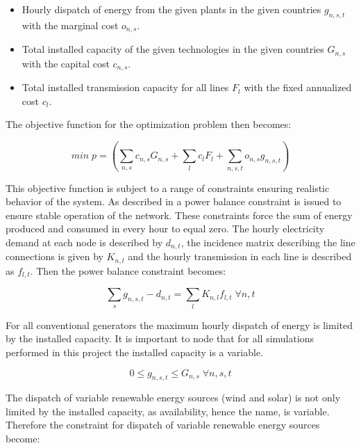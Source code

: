 \begin{itemize}
	\item Hourly dispatch of energy from the given plants in the given countries $g_{n,s,t}$ with the marginal cost $o_{n,s}$.
	\item Total installed capacity of the given technologies in the given countries $G_{n,s}$ with the capital cost $c_{n,s}$.
	\item Total installed transmission capacity for all lines $F_{l}$ with the fixed annualized cost $c_{l}$.
	
\end{itemize}

The objective function for the optimization problem then becomes: 

\begin{equation}
min \; p = \left( \sum_{n,s} c_{n,s} G_{n,s} + \sum_l c_l F_l + \sum_{n,s,t} o_{n,s} g_{n,s,t} \right)
\end{equation}{}

This objective function is subject to a range of constraints ensuring realistic behavior of the system. As described in \cite{PyPSA_euro_30_model} a power balance constraint is issued to ensure stable operation of the network. These constraints force the sum of energy produced and consumed in every hour to equal zero. The hourly electricity demand at each node is described by $d_{n,t}$, the incidence matrix describing the line connections is given by $K_{n,l}$ and the hourly transmission in each line is described as $f_{l,t}$. Then the power balance constraint becomes:

\begin{equation}
\sum_s g_{n,s,t} - d_{n,t} = \sum_l K_{n,l} f_{l,t} \; \forall n,t
\end{equation}

For all conventional generators the maximum hourly dispatch of energy is limited by the installed capacity. It is important to node that for all simulations performed in this project the installed capacity is a variable. 

\begin{equation}
0\leq g_{n,s,t} \leq G_{n,s} \; \forall n,s,t
\end{equation}

The dispatch of variable renewable energy sources (wind and solar) is not only limited by the installed capacity, as availability, hence the name, is variable. Therefore the constraint for dispatch of variable renewable energy sources become:

